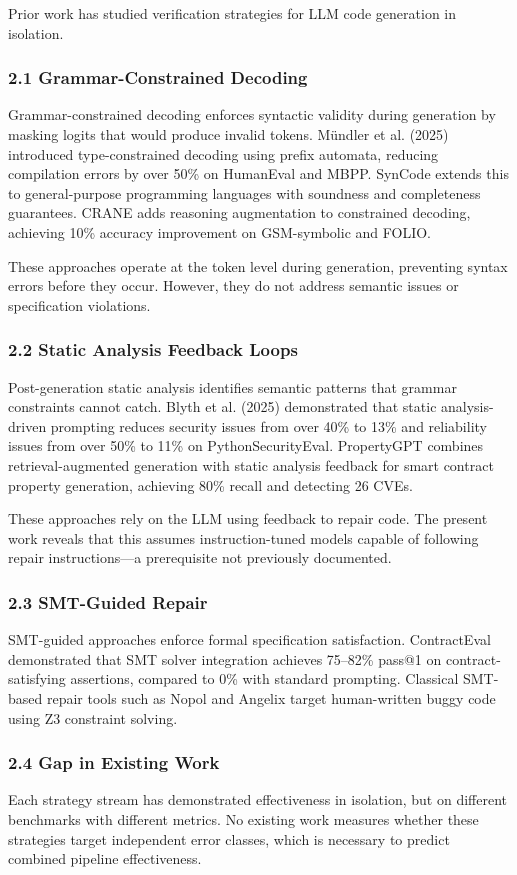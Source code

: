 
Prior work has studied verification strategies for LLM code generation in isolation.

\subsubsection{2.1 Grammar-Constrained Decoding}

Grammar-constrained decoding enforces syntactic validity during generation by masking logits that would produce invalid tokens. Mündler et al. (2025) introduced type-constrained decoding using prefix automata, reducing compilation errors by over 50\% on HumanEval and MBPP. SynCode extends this to general-purpose programming languages with soundness and completeness guarantees. CRANE \citep{banerjee2025crane} adds reasoning augmentation to constrained decoding, achieving 10\% accuracy improvement on GSM-symbolic and FOLIO.

These approaches operate at the token level during generation, preventing syntax errors before they occur. However, they do not address semantic issues or specification violations.

\subsubsection{2.2 Static Analysis Feedback Loops}

Post-generation static analysis identifies semantic patterns that grammar constraints cannot catch. Blyth et al. (2025) demonstrated that static analysis-driven prompting reduces security issues from over 40\% to 13\% and reliability issues from over 50\% to 11\% on PythonSecurityEval. PropertyGPT \citep{liu2024propertygpt} combines retrieval-augmented generation with static analysis feedback for smart contract property generation, achieving 80\% recall and detecting 26 CVEs.

These approaches rely on the LLM using feedback to repair code. The present work reveals that this assumes instruction-tuned models capable of following repair instructions---a prerequisite not previously documented.

\subsubsection{2.3 SMT-Guided Repair}

SMT-guided approaches enforce formal specification satisfaction. ContractEval \citep{lim2025contracteval} demonstrated that SMT solver integration achieves 75--82\% pass@1 on contract-satisfying assertions, compared to 0\% with standard prompting. Classical SMT-based repair tools such as Nopol and Angelix target human-written buggy code using Z3 constraint solving.

\subsubsection{2.4 Gap in Existing Work}

Each strategy stream has demonstrated effectiveness in isolation, but on different benchmarks with different metrics. No existing work measures whether these strategies target independent error classes, which is necessary to predict combined pipeline effectiveness.
